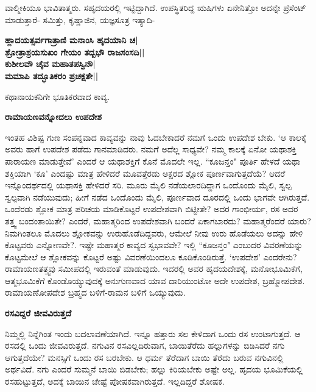 ವಾಲ್ಮೀಕಿಯೂ ಭಾವಿತಾತ್ಮರು. ಸಹೃದಯರಲ್ಲಿ ಇಟ್ಟಿದ್ದಾಗಿದೆ. ಉಪಸ್ಥಿತರಿದ್ದ ಋಷಿಗಳು ಏನೇನಿತ್ತೋ ಅದನ್ನೇ ಪ್ರೆಸೆಂಟ್‍ ಮಾಡುತ್ತಾರೆ- ಸಮಿತ್ತು, ಕೃಷ್ಣಾಜಿನ, ಯಜ್ಞಸೂತ್ರ ಇತ್ಯಾದಿ- 


\begin{center} 

{\bf ಹ್ಲಾದಯತ್ಸರ್ವಗಾತ್ರಾಣಿ ಮನಾಂಸಿ ಹೃದಯಾನಿ ಚ|\\ 

ಶ್ರೋತ್ರಾಶ್ರಯಸುಖಂ ಗೇಯಂ ತದ್ಬಭೌ ರಾಜಸಂಸದಿ||\\ 

ಕುಶೀಲವೌ ಚೈವ ಮಹಾತಪಸ್ವಿನೌ|\\ 

ಮಮಾಪಿ ತದ್ಭೂತಿಕರಂ ಪ್ರಚಕ್ಷತೇ||} 

\end{center} 


ಕಥಾನಾಯಕನಿಗೇ ಭೂತಿಕರವಾದ ಕಾವ್ಯ. 


\large{{\bf ರಾಮಾಯಣವನ್ನೋದಲು ಉಪದೇಶ}} 


ಇಂತಹ ವಿಶಿಷ್ಟ ಗುಣ ಸಂಪನ್ನವಾದ ಕಾವ್ಯವನ್ನು ನಾವು ಓದಬೇಕಾದರೆ ನಮಗೆ ಒಂದು ಉಪದೇಶ ಬೇಕು. `ಆ ಕಾಲಕ್ಕೆ ಅವರು ಹಾಗೆ ಉಪದೇಶ ಪಡೆದು ಗಾನಮಾಡಿದರು. ನಮಗೆ ಅದೆಲ್ಲ ಸಾಧ್ಯವೇ? ನಮ್ಮ ಕಾಲಕ್ಕೆ ಏನೋ ಯಥಾಶಕ್ತಿ ಪಾರಾಯಣ ಮಾಡುತ್ತೇವೆ' ಎಂದರೆ ಆ ಯಥಾಶಕ್ತಿಗೆ ಕೊನೆ ಮೊದಲೇ ಇಲ್ಲ. ``ಕೂಜನ್ತಂ" ಪೂರ್ತಿ ಹೇಳದೆ ಯಥಾ ಶಕ್ತಿಯಾಗಿ `ಕೂ' ಎಂದಷ್ಟು ಮಾತ್ರ ಹೇಳಿದರೆ ಮೂವತ್ತೆರಡು ಅಕ್ಷರದ ಶ್ಲೋಕ ಪೂರ್ಣವಾಗುತ್ತದೆಯೆ? ಆದರೆ ಇನ್ನೊಂದರ್ಥದಲ್ಲಿ ಯಥಾಸಕ್ತಿ ಹೇಳಿದರೆ ಸರಿ. ಮೂರು ಮೈಲಿ ನಡೆಯಲಾರದಿದ್ದಾಗ ಒಂದೊಂದು ಮೈಲಿ, ಸ್ವಲ್ಪ ಸ್ವಲ್ಪವಾಗಿ ನಡೆಯುವುದು; ಹೀಗೆ ನಡೆದ ಒಂದೊಂದು ಮೈಲಿ, ಪೂರ್ಣವಾದ ದೂರದಲ್ಲಿ ಒಂದು ಭಾಗವೇ ಆಗಿರುತ್ತದೆ. ಒಂದೆರಡು ಶ್ಲೋಕ ಮಾತ್ರ ಪರಿಚಯ ಮಾಡಿಕೊಟ್ಟರೆ ಉಪದೇಶವಾಗಿ ಬಿಟ್ಟೀತೇ? ಅದರ ಗಾಂಭೀರ್ಯ, ರಸ ಅದರ ತತ್ತ್ವ ಬಂದಂತಾಯಿತೇ? ಎಂದರೆ, ಮಹಾತ್ಮರಿಂದ ಉಪದೇಶವಾಗಿ ಬಂದರೆ ಏಕಾಗಬಾರದು? ಮಹಾತ್ಮರೆಂದರೆ ಯಾರು? ನಿಮಗಿಂತಲೂ ಮೊದಲು ಶ್ಲೋಕವನ್ನು ಉರುಹೊಡೆದಿದ್ದವರು, ಆಮೇಲೆ ನೀವು ಉರು ಹೊಡೆಯಲು ಅದನ್ನು ಹೇಳಿ ಕೊಟ್ಟವರು ಎನ್ನೋಣವೇ?. ಇಷ್ಟೇ ಮಹಾತ್ಮರ ಕಾವ್ಯದ ಸ್ವಭಾವವೇ? ಇಲ್ಲಿ ``ಕೂಜನ್ತಂ" ಎಂಬುದರ ವಿವರಣೆಯನ್ನು ಕೊಟ್ಟಮೇಲೆ ಆ ಶ್ಲೋಕವನ್ನು ಕೊಟ್ಟರೆ ಅಷ್ಟು ವಿವರಣೆಯಿಂದಲೂ ಕೂಡಿಕೊಂಡಿರುತ್ತೆ. `ಉಪದೇಶ' ಎಂದರೇನು? ರಾಮಾಯಣತತ್ತ್ವವು ಸಮೀಪದಲ್ಲಿ ಇರುವಂತೆ ಮಾಡುವುದು. ಇದರಲ್ಲಿ ಅವರ ಹೃದಯದೇಶಕ್ಕೆ, ಮನೋಭೂಮಿಕೆಗೆ, ಆತ್ಮಭೂಮಿಕೆಗೆ ಕೊಂಡೊಯ್ಯುವುದಕ್ಕೆ ಅನುಗುಣವಾದ ಯಾವ ದಾರಿಯುಂಟೋ ಅದೇ ಉಪದೇಶ, ಬ್ರಹ್ಮೋಪದೇಶ. ರಾಮಾಯಣೋಪದೇಶ ಬ್ರಹ್ಮದ ಬಳಿಗೆ-ರಾಮನ ಬಳಿಗೆ ಒಯ್ಯುವುದು. 


\large{{\bf ರಸವಿದ್ದರೆ ಜೀವವಿರುತ್ತದೆ}} 


ನಿಮ್ಮಲ್ಲಿ ನಿನ್ನೆಗಿಂತ ಇಂದು ಬದಲಾವಣೆಯಾಗಿದೆ. ಇನ್ನೂ ಹತ್ತಾರು ಸಲ ಕೇಳಿದಾಗ ಒಂದು ರಸ ಉಂಟಾಗುತ್ತದೆ. ಆ ರಸದಲ್ಲಿ ಒಂದು ಜೀವವಿರುತ್ತದೆ. ನಗುವಿನ ರಸವಿಲ್ಲದಿರುವಾಗ, ಬಾಯಿತೆರೆದು ಹಲ್ಲುಗಳನ್ನು ಬಿಡಿಸಿದರೆ ನಗು ಆಗುತ್ತದೆಯೇ? ಮನಸ್ಸಿಗೆ ಒಂದು ರಸ ಬರಬೇಕು. ಆ ಧರ್ಮ ತೆರೆದಾಗ ಬಾಯಿ ತೆರೆದು ಬರುವ ನಗುವಿನಲ್ಲಿ ಅರ್ಥವಿದೆ. ನಗು ಎಂದರೆ ಸುಮ್ಮನೆ ಬಾಯಿ ಬಿಡಬೇಕು; ಹಲ್ಲು ಕಿರಿಯಬೇಕು ಅಷ್ಟೇ ಅಲ್ಲ. ಹೃದಯ ಭೂಮಿಕೆಯಲ್ಲಿ ರಸಹುಟ್ಟುತ್ತದೆ, ಅದಕ್ಕೆ ಬಾಯಿನ ಚೇಷ್ಟೆ ಪೋಷಕವಾಗಿರುತ್ತದೆ. ಇಲ್ಲದಿದ್ದರೆ ಶೋಷಕ. 


